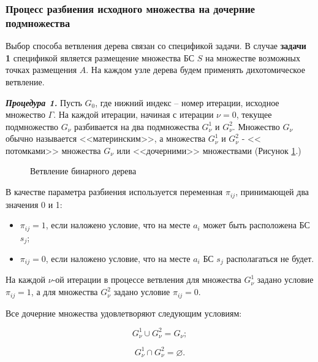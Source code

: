 \subsubsection{Процесс разбиения исходного множества на дочерние подмножества}

Выбор способа ветвления дерева связан со спецификой задачи. В случае \textbf{задачи 1} спецификой является размещение множества БС $S$ на множестве возможных точках размещения $A$. На каждом узле дерева будем применять дихотомическое ветвление.

\textit{\textbf{Процедура 1.}} Пусть $G_0$, где нижний индекс – номер итерации, исходное множество $\Gamma$. На каждой итерации, начиная с итерации $\nu=0$, текущее подмножество $G_\nu$ разбивается на два подмножества $G^1_\nu$ и $G^2_\nu$. Множество $G_\nu$ обычно называется <<материнским>>, а множества $G^1_\nu$  и $G^2_\nu$  - << потомками>> множества $G_\nu$ или <<дочерними>> множествами (Рисунок \cref{fig:part2_bst_child_nodes}.)

\begin{figure}[ht]
  \caption{Ветвление бинарного дерева}\label{fig:part2_bst_child_nodes}
\end{figure}

В качестве параметра разбиения используется переменная $\pi_{ij}$, принимающей два значения 0 и 1:

\begin{itemize}
    \item $\pi_{ij}=1$, если наложено условие, что на месте $a_i$ может быть расположена БС $s_j$;
    \item $\pi_{ij} = 0$, если наложено условие, что на месте $a_i$ БС $s_j$  располагаться не будет.
\end{itemize}

На каждой  $\nu$-ой итерации в процессе ветвления для множества $G^1_\nu$ задано условие $\pi_{ij}=1$, а для множества $G^2_\nu$  задано условие $\pi_{ij} = 0$.

Все дочерние множества удовлетворяют следующим условиям:

\begin{equation}
    \label{eq:part4_G_cup}
    G^1_\nu \cup G^2_\nu = G_\nu;
\end{equation}


\begin{equation}
    \label{eq:part4_G_cap}
    G^1_\nu \cap G^2_\nu = \varnothing.
\end{equation}

